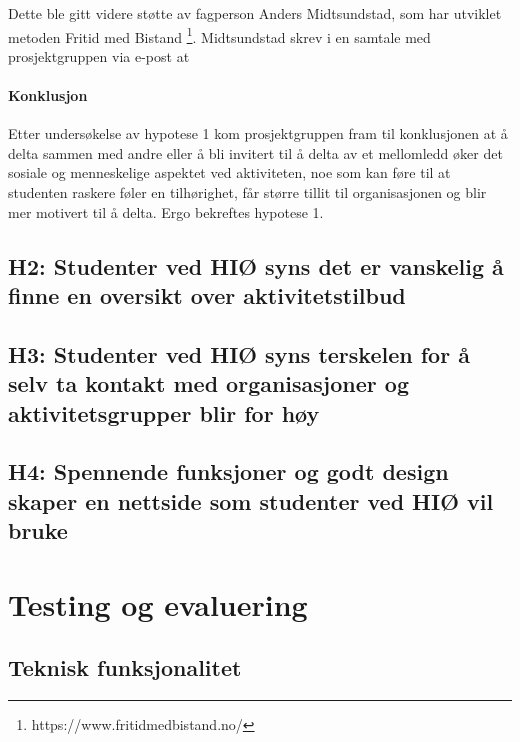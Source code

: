 Dette ble gitt videre støtte av fagperson Anders Midtsundstad, som har utviklet metoden Fritid med Bistand \footnote{https://www.fritidmedbistand.no/}. Midtsundstad skrev i en samtale med prosjektgruppen via e-post at  \cite{MIDTSUNDSTAD-EPOST:14}

\paragraph{Konklusjon}
Etter undersøkelse av hypotese 1 kom prosjektgruppen fram til konklusjonen at å delta sammen med andre eller å bli invitert til å delta av et mellomledd øker det sosiale og menneskelige aspektet ved aktiviteten, noe som kan føre til at studenten raskere føler en tilhørighet, får større tillit til organisasjonen og blir mer motivert til å delta. Ergo bekreftes hypotese 1.

\subsection{H2: Studenter ved HIØ syns det er vanskelig å finne en oversikt over aktivitetstilbud}

\subsection{H3: Studenter ved HIØ syns terskelen for å selv ta kontakt med organisasjoner og aktivitetsgrupper blir for høy }

\subsection{H4: Spennende funksjoner og godt design skaper en nettside som studenter ved HIØ vil bruke}


\section{Testing og evaluering}

\subsection{Teknisk funksjonalitet}

